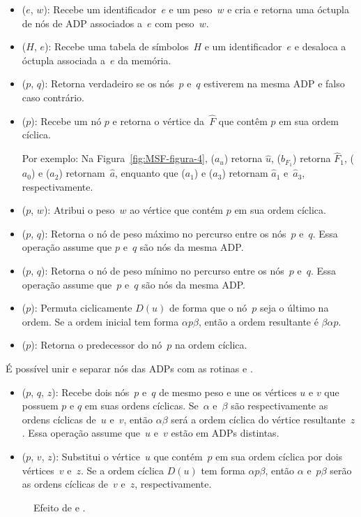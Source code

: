 \begin{itemize}
\item \LCOMakeOcto($e$, $w$): Recebe um identificador~$e$ e um peso~$w$ e cria e retorna uma óctupla de nós de ADP associados a~$e$ com peso~$w$.
\item \LCODestroyOcto($H$, $e$): Recebe uma tabela de símbolos~$H$ e um identificador~$e$ e desaloca a óctupla associada a~$e$ da memória.

\item \LCOConnected($p$, $q$): Retorna verdadeiro se os nós~$p$ e~$q$ estiverem na mesma ADP e falso caso contrário.
\item \LCOFindNode($p$): Recebe um nó $p$ e retorna o vértice da~$\hat F$ que contêm $p$ em sua ordem cíclica.

Por exemplo: Na Figura~\ref{fig:MSF-figura-4}, \LCOFindNode($a_u$) retorna $\hat u$, \LCOFindNode($b_{F_1}$) retorna $\hat F_1$, \LCOFindNode($a_0$) e \LCOFindNode($a_2$) retornam~$\hat a$, enquanto que \LCOFindNode($a_1$) e \LCOFindNode($a_3$) retornam $\hat a_1$ e~$\hat a_3$, respectivamente.
\item \LCOAddCost($p$, $w$): Atribui o peso~$w$ ao vértice que contém $p$ em sua ordem cíclica.
\item \LCOMax($p$, $q$): Retorna o nó de peso máximo no percurso entre os nós~$p$ e~$q$.
Essa operação assume que $p$ e~$q$ são nós da mesma ADP.
\item \LCOMin($p$, $q$): Retorna o nó de peso mínimo no percurso entre os nós~$p$ e~$q$.
Essa operação assume que~$p$ e~$q$ são nós da mesma ADP.
\item \LCOCycle($p$): Permuta ciclicamente $D(u)$ de forma que o nó~$p$ seja o último na ordem.
Se a ordem inicial tem forma $\alpha p \beta$, então a ordem resultante é $\beta\alpha p$.
\item \treapPredecessor($p$): Retorna o predecessor do nó~$p$ na ordem cíclica.
\end{itemize}

É possível unir e separar nós das ADPs com as rotinas \LCOMerge{} e \LCOSplit{}.

\begin{itemize}
\item \LCOMerge($p$, $q$, $z$): Recebe dois nós~$p$ e~$q$ de mesmo peso e une os vértices $u$ e $v$ que possuem $p$ e $q$ em suas ordens cíclicas.
Se~$\alpha$ e~$\beta$ são respectivamente as ordens cíclicas de~$u$ e~$v$, então $\alpha\beta$ será a ordem cíclica do vértice resultante~$z$. 
Essa operação assume que~$u$ e~$v$ estão em ADPs distintas.

\item \LCOSplit($p$, $v$, $z$): Substitui o vértice~$u$ que contém~$p$ em sua ordem cíclica por dois vértices~$v$ e~$z$.
Se a ordem cíclica $D(u)$ tem forma $\alpha p\beta$, então $\alpha$ e~$p\beta$ serão as ordens cíclicas de~$v$ e~$z$, respectivamente.

\end{itemize}
\begin{figure}[htb]
\scalebox{1}{
\centering

}
\caption{Efeito de \LCOMerge{} e \LCOSplit{}.}
\label{fig:MSF-Merge-Split}
\end{figure}



